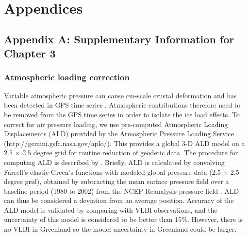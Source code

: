 \chapter*{Appendices}
\setcounter{figure}{0}
\setcounter{equation}{0}
\setcounter{table}{0}
\renewcommand{\thefigure}{A\arabic{figure}}
\renewcommand{\theequation}{A\arabic{equation}}
\renewcommand{\thetable}{A\arabic{table}}


\newpage
\section*{Appendix A: Supplementary Information for Chapter 3}
\subsection*{Atmospheric loading correction}
Variable atmospheric pressure can cause cm-scale crustal deformation \cite[]{magie1969source,darwin1882xlvi,petrov2004study} and has been detected in GPS time series \cite[]{vandam1994atmospheric,dong2002anatomy}.  Atmospheric contributions therefore need to be removed from the GPS time series in order to isolate the ice load effects.  To correct for air pressure loading, we use pre-computed Atmospheric Loading Displacements (ALD) provided by the Atmospheric Pressure Loading Service (http://gemini.gsfc.nasa.gov/aplo/).  This provides a global 3-D ALD model on a 2.5 $\times$ 2.5 degree grid for routine reduction of geodetic data.  The procedure for computing ALD is described by \citet{petrov2004study}.  Briefly, ALD is calculated by convolving Farrell’s elastic Green’s functions \cite[]{farrell1972deformation} with modeled global pressure data (2.5 $\times$ 2.5 degree grid), obtained by subtracting the mean surface pressure field over a baseline period (1980 to 2002) from the NCEP Reanalysis pressure field \cite[]{kalnay1996ncep}.  ALD can thus be considered a deviation from an average position. Accuracy of the ALD model is validated by comparing with VLBI observations, and the uncertainty of this model is considered to be better than 15\%.  However, there is no VLBI in Greenland so the model uncertainty in Greenland could be larger.

